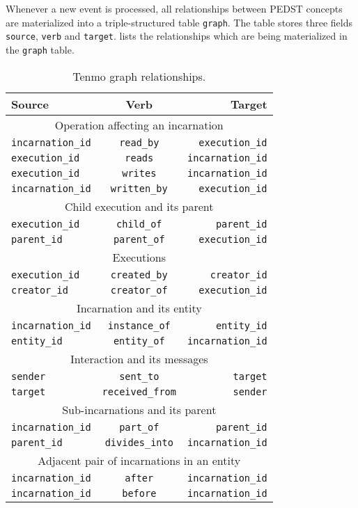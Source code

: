 Whenever a new event is processed, all relationships between PEDST concepts are materialized into a triple-structured table \texttt{graph}. The table stores three fields \texttt{source}, \texttt{verb} and \texttt{target}.  lists the relationships which are being materialized in the \texttt{graph} table.

\begin{table}[ht]
\centering
\begin{tabular}{l|c|r}
\hline
\textbf{Source} &          \textbf{Verb} &          \textbf{Target} \\
\hline
\multicolumn{3}{c}{Operation affecting an incarnation} \\
\hline
\texttt{incarnation\_id} & \texttt{read\_by} &      \texttt{execution\_id} \\
\texttt{execution\_id} &   \texttt{reads} &         \texttt{incarnation\_id} \\
\texttt{execution\_id} &   \texttt{writes} &        \texttt{incarnation\_id} \\
\texttt{incarnation\_id} & \texttt{written\_by} &   \texttt{execution\_id} \\
\hline
\multicolumn{3}{c}{Child execution and its parent} \\
\hline
\texttt{execution\_id} &   \texttt{child\_of} &     \texttt{parent\_id} \\
\texttt{parent\_id} &      \texttt{parent\_of} &    \texttt{execution\_id} \\
\hline
\multicolumn{3}{c}{Executions} \\
\hline
\texttt{execution\_id} &   \texttt{created\_by} &   \texttt{creator\_id} \\
\texttt{creator\_id} &     \texttt{creator\_of} &   \texttt{execution\_id} \\
\hline
\multicolumn{3}{c}{Incarnation and its entity} \\
\hline
\texttt{incarnation\_id} & \texttt{instance\_of} &  \texttt{entity\_id} \\
\texttt{entity\_id} &      \texttt{entity\_of} &    \texttt{incarnation\_id} \\
\hline
\multicolumn{3}{c}{Interaction and its messages} \\
\hline
\texttt{sender} & \texttt{sent\_to} &  \texttt{target} \\
\texttt{target} & \texttt{received\_from} &  \texttt{sender} \\
\hline
\multicolumn{3}{c}{Sub-incarnations and its parent} \\
\hline
\texttt{incarnation\_id} & \texttt{part\_of} &      \texttt{parent\_id} \\
\texttt{parent\_id} &      \texttt{divides\_into} & \texttt{incarnation\_id} \\
\hline
\multicolumn{3}{c}{Adjacent pair of incarnations in an entity} \\
\hline
\texttt{incarnation\_id} & \texttt{after}         & \texttt{incarnation\_id} \\
\texttt{incarnation\_id} & \texttt{before}        & \texttt{incarnation\_id}
\end{tabular}
\caption{Tenmo graph relationships.}
\label{tbl:tenmo-graph-rels}
\end{table}%

